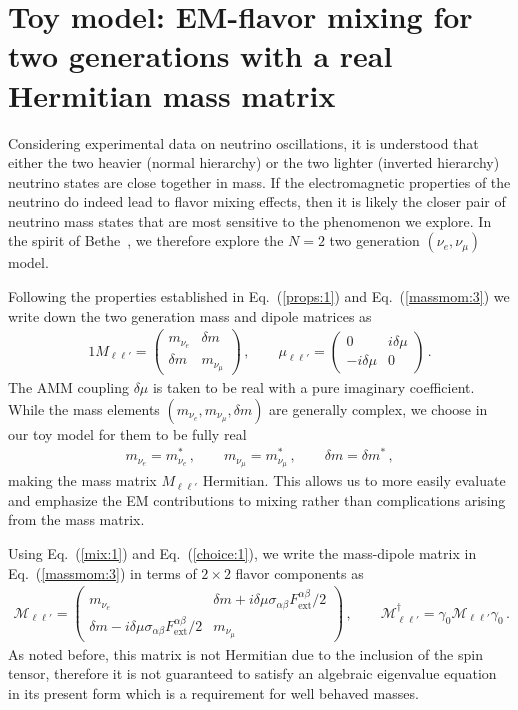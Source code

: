 \documentclass{ws-ijmpa}
\newcommand{\req}[1]{Eq.~(\ref{#1})}
\begin{document}
\section{Toy model: EM-flavor mixing for two generations with a real Hermitian mass matrix}
\label{sec:toy}
Considering experimental data on neutrino oscillations, it is understood that either the two heavier (normal hierarchy) or the two lighter (inverted hierarchy) neutrino states are close together in mass. If the electromagnetic properties of the neutrino do indeed lead to flavor mixing effects, then it is likely the closer pair of neutrino mass states that are most sensitive to the phenomenon we explore. In the spirit of Bethe~\cite{Bethe:1986ej}, we therefore explore the $N=2$ two generation $(\nu_{e},\nu_{\mu})$ model.

Following the properties established in \req{props:1} and \req{massmom:3} we write down the two generation mass and dipole matrices as
\begin{alignat}{1}
\label{mix:1} M_{\ell\ell'}= 
\begin{pmatrix}
m_{\nu_{e}} & {\delta m}\\
{\delta m} & m_{\nu_{\mu}}
\end{pmatrix}\,,\qquad
\mu_{\ell\ell'} = 
\begin{pmatrix}
0 & i\delta\mu\\
-i\delta\mu & 0
\end{pmatrix}\,.
\end{alignat}
The AMM coupling $\delta\mu$ is taken to be real with a pure imaginary coefficient. While the mass elements $(m_{\nu_{e}},m_{\nu_{\mu}},{\delta m})$ are generally complex, we choose in our toy model for them to be fully real
\begin{align}
\label{choice:1}
m_{\nu_{e}}=m_{\nu_{e}}^{*}\,,\qquad
m_{\nu_{\mu}}=m_{\nu_{\mu}}^{*}\,,\qquad
\delta m=\delta m^{*}\,,
\end{align}
making the mass matrix $M_{\ell\ell'}$ Hermitian. This allows us to more easily evaluate and emphasize the EM contributions to mixing rather than complications arising from the mass matrix.

Using \req{mix:1} and \req{choice:1}, we write the mass-dipole matrix in \req{massmom:3} in terms of $2\times2$ flavor components as
\begin{align}
\label{mix:2}
\mathcal{M}_{\ell\ell'} = 
\begin{pmatrix}
m_{\nu_{e}} & {\delta m}+i\delta\mu\sigma_{\alpha\beta}F^{\alpha\beta}_\mathrm{ext}/2\\
{\delta m}-i\delta\mu\sigma_{\alpha\beta}F^{\alpha\beta}_\mathrm{ext}/2 & m_{\nu_{\mu}}
\end{pmatrix}\,,\qquad
\mathcal{M}_{\ell\ell'}^{\dag}=\gamma_{0}\mathcal{M}_{\ell\ell'}\gamma_{0}\,.
\end{align}
As noted before, this matrix is not Hermitian due to the inclusion of the spin tensor, therefore it is not guaranteed to satisfy an algebraic eigenvalue equation in its present form which is a requirement for well behaved masses.
\end{document}
